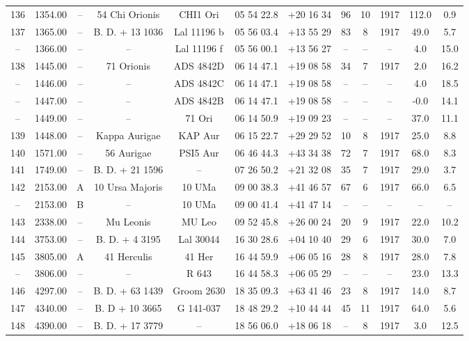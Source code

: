 \begin{table}
\begin{tabular}{cccccccccccc}
136 & 1354.00 & -- & 54 Chi Orionis & CHI1 Ori & 05 54 22.8 & +20 16 34 & 96 & 10 & 1917 & 112.0 & 0.9 \\
137 & 1365.00 & -- & B. D. + 13  1036 & Lal 11196 b & 05 56 03.4 & +13 55 29 & 83 & 8 & 1917 & 49.0 & 5.7 \\
-- & 1366.00 & -- & -- & Lal 11196 f & 05 56 00.1 & +13 56 27 & -- & -- & -- & 4.0 & 15.0 \\
138 & 1445.00 & -- & 71 Orionis & ADS 4842D & 06 14 47.1 & +19 08 58 & 34 & 7 & 1917 & 2.0 & 16.2 \\
-- & 1446.00 & -- & -- & ADS 4842C & 06 14 47.1 & +19 08 58 & -- & -- & -- & 4.0 & 18.5 \\
-- & 1447.00 & -- & -- & ADS 4842B & 06 14 47.1 & +19 08 58 & -- & -- & -- & -0.0 & 14.1 \\
-- & 1449.00 & -- & -- & 71 Ori & 06 14 50.9 & +19 09 23 & -- & -- & -- & 37.0 & 11.1 \\
139 & 1448.00 & -- & Kappa Aurigae & KAP Aur & 06 15 22.7 & +29 29 52 & 10 & 8 & 1917 & 25.0 & 8.8 \\
140 & 1571.00 & -- & 56 Aurigae & PSI5 Aur & 06 46 44.3 & +43 34 38 & 72 & 7 & 1917 & 68.0 & 8.3 \\
141 & 1749.00 & -- & B. D. + 21  1596 & -- & 07 26 50.2 & +21 32 08 & 35 & 7 & 1917 & 29.0 & 3.7 \\
142 & 2153.00 & A & 10 Ursa Majoris & 10 UMa & 09 00 38.3 & +41 46 57 & 67 & 6 & 1917 & 66.0 & 6.5 \\
-- & 2153.00 & B & -- & 10 UMa & 09 00 41.4 & +41 47 14 & -- & -- & -- & -- & -- \\
143 & 2338.00 & -- & Mu Leonis & MU Leo & 09 52 45.8 & +26 00 24 & 20 & 9 & 1917 & 22.0 & 10.2 \\
144 & 3753.00 & -- & B. D. + 4  3195 & Lal 30044 & 16 30 28.6 & +04 10 40 & 29 & 6 & 1917 & 30.0 & 7.0 \\
145 & 3805.00 & A & 41 Herculis & 41 Her & 16 44 59.9 & +06 05 16 & 28 & 8 & 1917 & 28.0 & 7.8 \\
-- & 3806.00 & -- & -- & R 643 & 16 44 58.3 & +06 05 29 & -- & -- & -- & 23.0 & 13.3 \\
146 & 4297.00 & -- & B. D. + 63  1439 & Groom 2630 & 18 35 09.3 & +63 41 46 & 23 & 8 & 1917 & 14.0 & 8.7 \\
147 & 4340.00 & -- & B. D + 10  3665 & G 141-037 & 18 48 29.2 & +10 44 44 & 45 & 11 & 1917 & 64.0 & 5.6 \\
148 & 4390.00 & -- & B. D. + 17  3779 & -- & 18 56 06.0 & +18 06 18 & -- & 8 & 1917 & 3.0 & 12.5 \\

\end{tabular}
\end{table}
